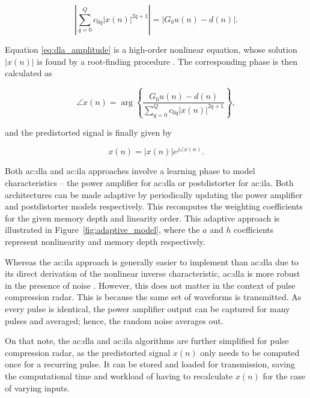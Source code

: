 \begin{equation}
  \left|\sum_{q=0}^{Q} c_{0q}\left|x(n)\right|^{2q+1}\right| = \left|G_0 u(n) - d(n)\right| .
  \label{eq:dla_amplitude}
\end{equation}

Equation \eqref{eq:dla_amplitude} is a high-order nonlinear equation, whose solution $|x(n)|$ is found by a root-finding procedure \cite{feng2016}. The corresponding phase is then calculated as

\begin{equation}
  \angle x(n) = \arg\left\{\frac{G_0 u(n) - d(n)}{\sum_{q=0}^{Q} c_{0q}\left|x(n)\right|^{2q+1}}\right\},
  \label{eq:dla_phase}
\end{equation}

and the predistorted signal is finally given by

\begin{equation}
  x(n) = \left|x(n)\right| e^{j\angle x(n)}.
  \label{eq:dla_predistorted}
\end{equation}

Both \gls{ac:dla} and \gls{ac:ila} approaches involve a learning phase to model characteristics -- the power amplifier for \gls{ac:dla} or postdistorter for \gls{ac:ila}. Both architectures can be made adaptive by periodically updating the power amplifier and postdistorter models respectively. This recomputes the weighting coefficients for the given memory depth and linearity order. This adaptive approach is illustrated in Figure~\ref{fig:adaptive_model}, where the $a$ and $h$ coefficients represent nonlinearity and memory depth respectively.

Whereas the \gls{ac:ila} approach is generally easier to implement than \gls{ac:dla} due to its direct derivation of the nonlinear inverse characteristic, \gls{ac:dla} is more robust in the presence of noise \cite{abihussein2012}. However, this does not matter in the context of pulse compression radar. This is because the same set of waveforms is transmitted. As every pulse is identical, the power amplifier output can be captured for many pulses and averaged; hence, the random noise averages out. 

On that note, the \gls{ac:dla} and \gls{ac:ila} algorithms are further simplified for pulse compression radar, as the predistorted signal $x(n)$ only needs to be computed once for a recurring pulse. It can be stored and loaded for transmission, saving the computational time and workload of having to recalculate $x(n)$ for the case of varying inputs.  

